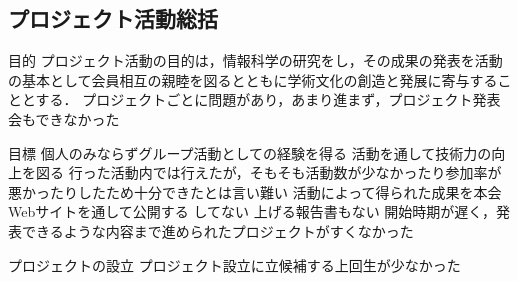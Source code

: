 \subsection*{プロジェクト活動総括}


目的
プロジェクト活動の目的は，情報科学の研究をし，その成果の発表を活動の基本として会員相互の親睦を図るとともに学術文化の創造と発展に寄与することとする．
    プロジェクトごとに問題があり，あまり進まず，プロジェクト発表会もできなかった

目標
個人のみならずグループ活動としての経験を得る
活動を通して技術力の向上を図る
    行った活動内では行えたが，そもそも活動数が少なかったり参加率が悪かったりしたため十分できたとは言い難い
活動によって得られた成果を本会Webサイトを通して公開する
    してない
    上げる報告書もない
    開始時期が遅く，発表できるような内容まで進められたプロジェクトがすくなかった

プロジェクトの設立
    プロジェクト設立に立候補する上回生が少なかった
